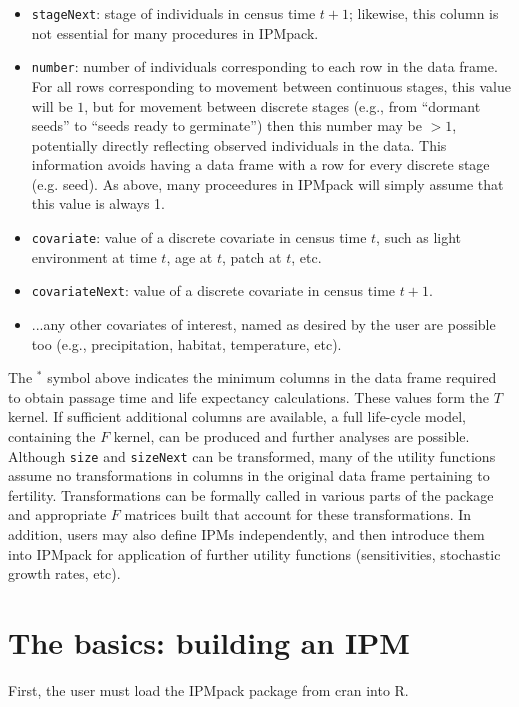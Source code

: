 \documentclass{article}
\begin{document}
\begin{itemize}
\item  {\tt stageNext}: stage of individuals in census time $t+1$;  likewise, this column is not essential for many procedures in  IPMpack.  
\item  {\tt number}: number of individuals corresponding to each row in the data frame. For all rows corresponding to movement between continuous stages, this value will be $1$, but for movement between  discrete stages (e.g., from ``dormant seeds'' to ``seeds ready to  germinate'') then this number may be $>1$, potentially directly  reflecting observed individuals in the data. This information avoids having a data frame with a row for every discrete stage (e.g. seed). As above, many  proceedures in IPMpack will simply assume that this value is always 1. 
\item  {\tt covariate}: value of a discrete covariate in census time  $t$, such as light environment at time $t$, age at $t$, patch at $t$, etc. 
\item  {\tt covariateNext}: value of a discrete covariate in census time $t+1$.
\item  ...any other covariates of interest, named as desired by the user are possible too (e.g., precipitation, habitat, temperature, etc).
\end{itemize}

The $^*$ symbol above indicates the minimum columns in the data frame required to obtain passage time and life expectancy calculations. These values form the $T$ kernel. If sufficient additional columns are available, a full life-cycle model, containing the $F$ kernel, can be produced and further analyses are possible.  Although {\tt size} and {\tt sizeNext} can be transformed, many of the utility functions assume no transformations in columns in the original data frame pertaining to fertility. Transformations can be formally called in various parts of the package and appropriate $F$ matrices built that account for these transformations. In addition, users may also define IPMs independently, and then introduce them into IPMpack for application of further utility functions (sensitivities, stochastic growth rates, etc). 


\section{The basics: building an IPM}

First, the user must load the IPMpack package from cran into R. 
\end{document}
